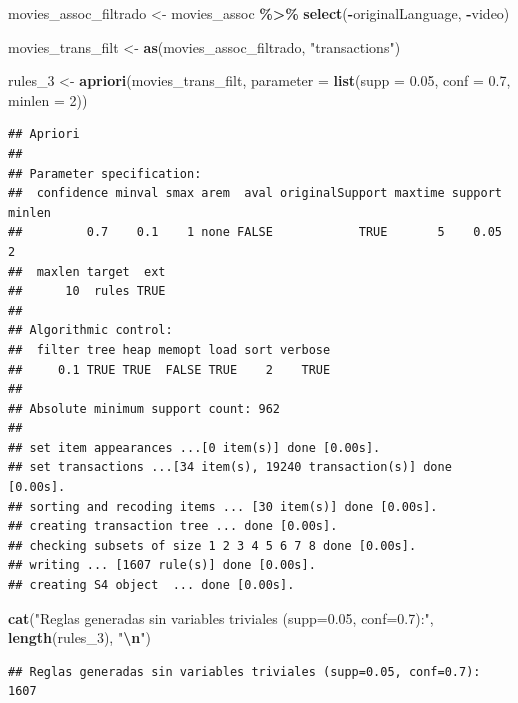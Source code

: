 \documentclass[
]{article}
\newenvironment{Shaded}{\begin{snugshade}}{\end{snugshade}}
\newcommand{\AttributeTok}[1]{\textcolor[rgb]{0.13,0.29,0.53}{#1}}
\newcommand{\DecValTok}[1]{\textcolor[rgb]{0.00,0.00,0.81}{#1}}
\newcommand{\FloatTok}[1]{\textcolor[rgb]{0.00,0.00,0.81}{#1}}
\newcommand{\FunctionTok}[1]{\textcolor[rgb]{0.13,0.29,0.53}{\textbf{#1}}}
\newcommand{\NormalTok}[1]{#1}
\newcommand{\OtherTok}[1]{\textcolor[rgb]{0.56,0.35,0.01}{#1}}
\newcommand{\SpecialCharTok}[1]{\textcolor[rgb]{0.81,0.36,0.00}{\textbf{#1}}}
\newcommand{\StringTok}[1]{\textcolor[rgb]{0.31,0.60,0.02}{#1}}
\begin{document}
\begin{Shaded}
\begin{Highlighting}[]
\NormalTok{movies\_assoc\_filtrado }\OtherTok{\textless{}{-}}\NormalTok{ movies\_assoc }\SpecialCharTok{\%\textgreater{}\%}
  \FunctionTok{select}\NormalTok{(}\SpecialCharTok{{-}}\NormalTok{originalLanguage, }\SpecialCharTok{{-}}\NormalTok{video)}

\NormalTok{movies\_trans\_filt }\OtherTok{\textless{}{-}} \FunctionTok{as}\NormalTok{(movies\_assoc\_filtrado, }\StringTok{"transactions"}\NormalTok{)}

\NormalTok{rules\_3 }\OtherTok{\textless{}{-}} \FunctionTok{apriori}\NormalTok{(movies\_trans\_filt,}
                   \AttributeTok{parameter =} \FunctionTok{list}\NormalTok{(}\AttributeTok{supp =} \FloatTok{0.05}\NormalTok{, }\AttributeTok{conf =} \FloatTok{0.7}\NormalTok{, }\AttributeTok{minlen =} \DecValTok{2}\NormalTok{))}
\end{Highlighting}
\end{Shaded}

\begin{verbatim}
## Apriori
## 
## Parameter specification:
##  confidence minval smax arem  aval originalSupport maxtime support minlen
##         0.7    0.1    1 none FALSE            TRUE       5    0.05      2
##  maxlen target  ext
##      10  rules TRUE
## 
## Algorithmic control:
##  filter tree heap memopt load sort verbose
##     0.1 TRUE TRUE  FALSE TRUE    2    TRUE
## 
## Absolute minimum support count: 962 
## 
## set item appearances ...[0 item(s)] done [0.00s].
## set transactions ...[34 item(s), 19240 transaction(s)] done [0.00s].
## sorting and recoding items ... [30 item(s)] done [0.00s].
## creating transaction tree ... done [0.00s].
## checking subsets of size 1 2 3 4 5 6 7 8 done [0.00s].
## writing ... [1607 rule(s)] done [0.00s].
## creating S4 object  ... done [0.00s].
\end{verbatim}

\begin{Shaded}
\begin{Highlighting}[]
\FunctionTok{cat}\NormalTok{(}\StringTok{"Reglas generadas sin variables triviales (supp=0.05, conf=0.7):"}\NormalTok{, }\FunctionTok{length}\NormalTok{(rules\_3), }\StringTok{"}\SpecialCharTok{\textbackslash{}n}\StringTok{"}\NormalTok{)}
\end{Highlighting}
\end{Shaded}

\begin{verbatim}
## Reglas generadas sin variables triviales (supp=0.05, conf=0.7): 1607
\end{verbatim}
\end{document}
